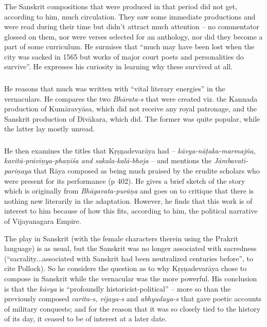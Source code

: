 \subsubsection{} The Sanskrit compositions that were produced in that period did not get, according to him, much circulation. They saw some immediate productions and were read during their time but didn’t attract much attention – no commentator glossed on them, nor were verses selected for an anthology, nor did they become a part of some curriculum. He surmises that “much may have been lost when the city was sacked in 1565 but works of major court poets and personalities do survive”. He expresses his curiosity in learning why these survived at all.
\vskip 1.5pt

\subsubsection{} He reasons that much was written with “vital literary energies” in the vernaculars. He compares the two {\sl Bhārata-s} that were created viz. the Kannada production of Kumāravyāsa, which did not receive any royal patronage, and the Sanskrit production of Divākara, which did. The former was quite popular, while the latter lay mostly unread.
\vskip 1.5pt

\subsubsection{} He then examines the titles that Kṛṣṇadevarāya had {\sl – kāvya-nāṭaka-marmajña, kavitā-prāvīṇya-phaṇīśa and sakala-kalā-bhoja} – and mentions the {\sl Jāmbavatī-pariṇaya} that Rāya composed as being much praised by the erudite scholars who were present for its performance (p 402). He gives a brief sketch of the story which is originally from {\sl Bhāgavata-purāṇa} and goes on to critique that there is nothing new literarily in the adaptation. However, he finds that this work is of interest to him because of how this fits, according to him, the political narrative of Vijayanagara Empire.

The play in Sanskrit (with the female characters therein using the Prakrit language) is as usual, but the Sanskrit was no longer associated with sacredness (“sacrality...associated with Sanskrit had been neutralized centuries before”, to cite Pollock). So he considers the question as to why Kṛṣṇadevarāya chose to compose in Sanskrit while the vernacular was the more powerful. His conclusion is that the {\sl kāvya} is “profoundly historicist-political” – more so than the previously composed {\sl carita-s, vijaya-s} and {\sl abhyudaya-s} that gave poetic accounts of military conquests; and for the reason that it was so closely tied to the history of its day, it ceased to be of interest at a later date.	

